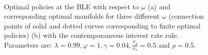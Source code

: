 

\begin{figure}
    \begin{center}
        \mbox{\quad
        }
   \end{center}
   \caption{\label{optomega}  Optimal policies at the BLE with respect to $\omega$ (a) and corresponding optimal manifolds for three different $\omega$ (connection points of solid and dotted curves corresponding to finite optimal policies) (b) with the contemporaneous interest rate rule. Parameters are: $\lambda=0.99, \varphi=1, \gamma=0.04,\frac{\sigma_y}{\sigma_{\pi}}=0.5$ and $\rho=0.5$.}
    \end{figure}
    

